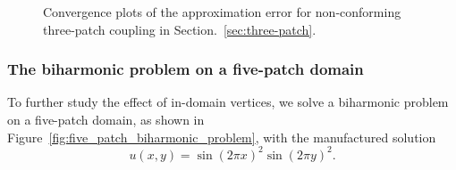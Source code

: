 \begin{figure}[ht]
	\centering
	\begin{subfigure}[b]{0.47\textwidth}
		
	\end{subfigure}
	\hfill
	\begin{subfigure}[b]{0.47\textwidth}
		
	\end{subfigure}
	\caption{Convergence plots of the approximation error for non-conforming three-patch coupling in Section.~\ref{sec:three-patch}.}\label{fig:three_patch_approximation}
\end{figure}
\FloatBarrier

\subsubsection{The biharmonic problem on a five-patch domain}\label{sec:five-patch}

To further study the effect of in-domain vertices, we solve a biharmonic problem on a five-patch domain, as shown in Figure~\ref{fig:five_patch_biharmonic_problem}, with the manufactured solution
\begin{equation}
	u(x,y)=\sin(2\pi{x})^2\sin(2\pi{y})^2.
\end{equation}

